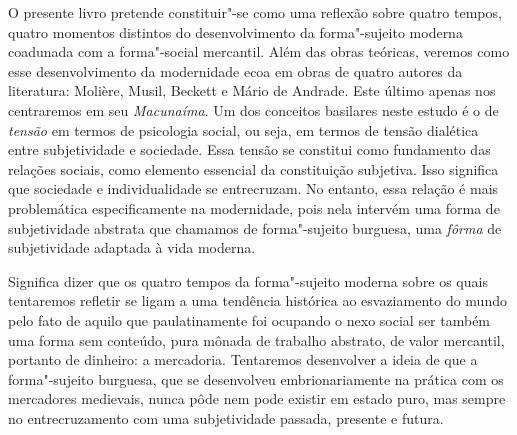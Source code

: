 O presente livro pretende constituir"-se como uma reflexão sobre quatro
tempos, quatro momentos distintos do desenvolvimento da forma"-sujeito
moderna coadunada com a forma"-social mercantil. Além das obras teóricas,
veremos como esse desenvolvimento da modernidade ecoa em obras de quatro
autores da literatura: Molière, Musil, Beckett e Mário de Andrade. Este
último apenas nos centraremos em seu \emph{Macunaíma}. Um dos conceitos
basilares neste estudo é o de \emph{tensão} em termos de psicologia
social, ou seja, em termos de tensão dialética entre subjetividade e
sociedade. Essa tensão se constitui como fundamento das relações
sociais, como elemento essencial da constituição subjetiva. Isso
significa que sociedade e individualidade se entrecruzam. No entanto,
essa relação é mais problemática especificamente na modernidade, pois
nela intervém uma forma de subjetividade abstrata que chamamos de
forma"-sujeito burguesa, uma \emph{fôrma} de subjetividade adaptada à
vida moderna.

Significa dizer que os quatro tempos da forma"-sujeito moderna sobre os
quais tentaremos refletir se ligam a uma tendência histórica ao
esvaziamento do mundo pelo fato de aquilo que paulatinamente foi
ocupando o nexo social ser também uma forma sem conteúdo, pura mônada de
trabalho abstrato, de valor mercantil, portanto de dinheiro: a
mercadoria. Tentaremos desenvolver a ideia de que a forma"-sujeito
burguesa, que se desenvolveu embrionariamente na prática com os
mercadores medievais, nunca pôde nem pode existir em estado puro, mas
sempre no entrecruzamento com uma subjetividade passada, presente e
futura.

